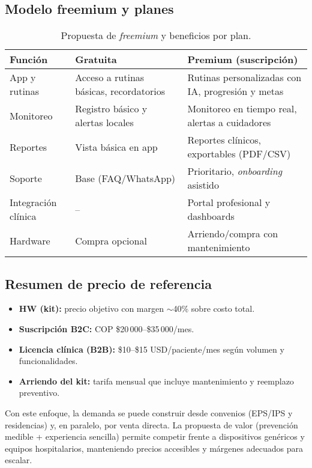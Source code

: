 \subsection{Modelo freemium y planes}

\begin{table}[H]
\centering
\renewcommand{\arraystretch}{1.12}
\begin{tabular}{p{4.0cm} p{5.6cm} p{5.6cm}}
\toprule
\textbf{Función} & \textbf{Gratuita} & \textbf{Premium (suscripción)}\\
\midrule
App y rutinas & Acceso a rutinas básicas, recordatorios & Rutinas personalizadas con IA, progresión y metas \\
Monitoreo & Registro básico y alertas locales & Monitoreo en tiempo real, alertas a cuidadores \\
Reportes & Vista básica en app & Reportes clínicos, exportables (PDF/CSV) \\
Soporte & Base (FAQ/WhatsApp) & Prioritario, \emph{onboarding} asistido \\
Integración clínica & -- & Portal profesional y dashboards \\
Hardware & Compra opcional & Arriendo/compra con mantenimiento \\
\bottomrule
\end{tabular}
\caption{Propuesta de \emph{freemium} y beneficios por plan.}
\end{table}

\subsection{Resumen de precio de referencia}
\begin{itemize}
    \item \textbf{HW (kit):} precio objetivo con margen $\sim$40\% sobre costo total.
    \item \textbf{Suscripción B2C:} COP \$20\,000--\$35\,000/mes.
    \item \textbf{Licencia clínica (B2B):} \$10--\$15 USD/paciente/mes según volumen y funcionalidades.
    \item \textbf{Arriendo del kit:} tarifa mensual que incluye mantenimiento y reemplazo preventivo.
\end{itemize}

\medskip
Con este enfoque, la demanda se puede construir desde convenios (EPS/IPS y residencias) y, en paralelo, por venta directa. La propuesta de valor (prevención medible + experiencia sencilla) permite competir frente a dispositivos genéricos y equipos hospitalarios, manteniendo precios accesibles y márgenes adecuados para escalar.
